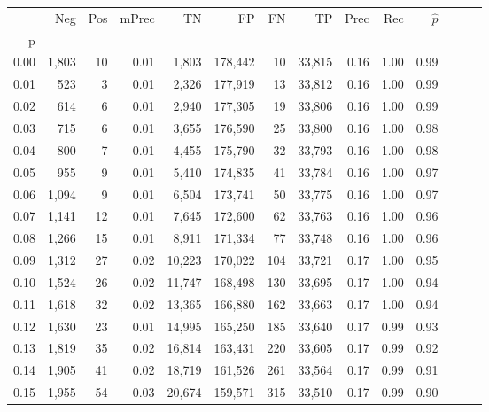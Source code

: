 \begin{tabular}{rrrrrrrrrrrrrr}
\toprule
{} &    Neg &  Pos & mPrec &       TN &       FP &      FN &      TP &  Prec &   Rec & $\hat{p}$ \\
p    &        &      &       &          &          &         &         &       &       &           \\
\midrule
0.00 &  1,803 &   10 &  0.01 &    1,803 &  178,442 &      10 &  33,815 &  0.16 &  1.00 &      0.99 \\
0.01 &    523 &    3 &  0.01 &    2,326 &  177,919 &      13 &  33,812 &  0.16 &  1.00 &      0.99 \\
0.02 &    614 &    6 &  0.01 &    2,940 &  177,305 &      19 &  33,806 &  0.16 &  1.00 &      0.99 \\
0.03 &    715 &    6 &  0.01 &    3,655 &  176,590 &      25 &  33,800 &  0.16 &  1.00 &      0.98 \\
0.04 &    800 &    7 &  0.01 &    4,455 &  175,790 &      32 &  33,793 &  0.16 &  1.00 &      0.98 \\
0.05 &    955 &    9 &  0.01 &    5,410 &  174,835 &      41 &  33,784 &  0.16 &  1.00 &      0.97 \\
0.06 &  1,094 &    9 &  0.01 &    6,504 &  173,741 &      50 &  33,775 &  0.16 &  1.00 &      0.97 \\
0.07 &  1,141 &   12 &  0.01 &    7,645 &  172,600 &      62 &  33,763 &  0.16 &  1.00 &      0.96 \\
0.08 &  1,266 &   15 &  0.01 &    8,911 &  171,334 &      77 &  33,748 &  0.16 &  1.00 &      0.96 \\
0.09 &  1,312 &   27 &  0.02 &   10,223 &  170,022 &     104 &  33,721 &  0.17 &  1.00 &      0.95 \\
0.10 &  1,524 &   26 &  0.02 &   11,747 &  168,498 &     130 &  33,695 &  0.17 &  1.00 &      0.94 \\
0.11 &  1,618 &   32 &  0.02 &   13,365 &  166,880 &     162 &  33,663 &  0.17 &  1.00 &      0.94 \\
0.12 &  1,630 &   23 &  0.01 &   14,995 &  165,250 &     185 &  33,640 &  0.17 &  0.99 &      0.93 \\
0.13 &  1,819 &   35 &  0.02 &   16,814 &  163,431 &     220 &  33,605 &  0.17 &  0.99 &      0.92 \\
0.14 &  1,905 &   41 &  0.02 &   18,719 &  161,526 &     261 &  33,564 &  0.17 &  0.99 &      0.91 \\
0.15 &  1,955 &   54 &  0.03 &   20,674 &  159,571 &     315 &  33,510 &  0.17 &  0.99 &      0.90 \\

\end{tabular}
